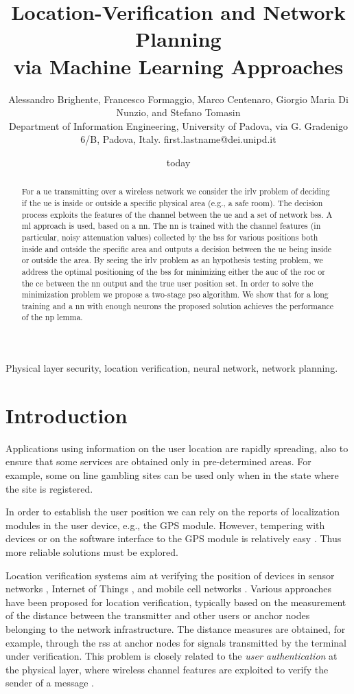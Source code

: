 \documentclass[conference,draftcls,onecolumn]{IEEEtran}
\title{Location-Verification and Network Planning \\ via Machine Learning Approaches}
\author{Alessandro Brighente, Francesco Formaggio, Marco Centenaro, Giorgio Maria Di Nunzio, and    Stefano Tomasin \\ {\small Department of Information Engineering, University of Padova, via G. Gradenigo 6/B, Padova, Italy. first.lastname@dei.unipd.it} }
\date{today}
\begin{document}
\maketitle

\begin{abstract}
For a \ac{ue} transmitting over a wireless network we consider the \ac{irlv} problem of deciding if the \ac{ue} is inside or outside a specific physical area (e.g., a safe room). The decision process exploits the features of the channel between the \ac{ue} and a set of network \acp{bs}. A  \ac{ml} approach is used, based on a \ac{nn}. The \ac{nn} is trained with the channel features (in particular, noisy attenuation values) collected by the \acp{bs} for various positions both inside and outside the specific area and outputs a decision between the \ac{ue} being inside or outside the area. By seeing the \ac{irlv} problem as an hypothesis testing problem, we address the optimal positioning of the \acp{bs} for minimizing either the \ac{auc} of the \ac{roc} or  the \ac{ce} between the \ac{nn} output and the true user position set. In order to solve the minimization problem we propose a two-stage \ac{pso} algorithm. We show that for a long training and a \ac{nn} with enough neurons the proposed solution achieves the performance of the \ac{np} lemma.
\end{abstract}

\begin{IEEEkeywords}
Physical layer security, location verification, neural network, network planning.
\end{IEEEkeywords}
\glsresetall

\section{Introduction}

Applications using information on the user location are rapidly spreading, also to ensure that some services are obtained only in pre-determined areas. For example, some on line gambling sites can be used only when in the state where the site is registered.

In order to establish the user position we can rely on the reports of localization modules in the user device, e.g., the GPS module. However, tempering with devices or on the software interface to the GPS module is relatively easy \cite{ceccato2018exploiting}. Thus more reliable solutions must be explored.

Location verification systems aim at verifying the position of devices in sensor networks \cite{Zeng-survey, 8376254}, Internet of Things \cite{7903611}, and mobile cell networks \cite{quaglia}. Various approaches have been proposed for location verification, typically based on the measurement of the distance between the transmitter and other users  or  anchor nodes belonging to the network infrastructure. The distance measures are obtained, for example, through the \ac{rss} at anchor nodes for signals transmitted by the terminal under verification.  This problem is closely related to the {\em user authentication} at the physical layer, where wireless channel features are exploited to verify the sender of a message \cite{7270404}.
\end{document}
